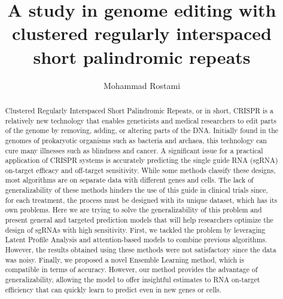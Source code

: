 \documentclass[12pt,a4paper,BCOR=.7cm,headsepline,bibliography=totoc]{report}
\begin{document}
\begin{latin}
\begin{abstract}
Clustered Regularly Interspaced Short Palindromic Repeats, or in short, CRISPR is a relatively new
technology that enables geneticists and medical researchers to edit parts of the genome by removing,
adding, or altering parts of the DNA. Initially found in the genomes of prokaryotic organisms such as
bacteria and archaea, this technology can cure many illnesses such as blindness and cancer. A significant
issue for a practical application of CRISPR systems is accurately predicting the single guide RNA
(sgRNA) on-target efficacy and off-target sensitivity. While some methods classify these designs, most
algorithms are on separate data with different genes and cells. The lack of generalizability of these methods
hinders the use of this guide in clinical trials since, for each treatment, the process must be designed
with its unique dataset, which has its own problems. Here we are trying to solve the generalizability
of this problem and present general and targeted prediction models that will help researchers optimize
the design of sgRNAs with high sensitivity. First, we tackled the problem by leveraging Latent Profile
Analysis and attention-based models to combine previous algorithms. However, the results obtained
using these methods were not satisfactory since the data was noisy. Finally,
we proposed a novel Ensemble Learning method, which is compatible in terms of accuracy. However, our
method provides the advantage of generalizability, allowing the model to offer insightful estimates to
RNA on-target efficiency that can quickly learn to predict even in new genes or cells.
\end{abstract}
\end{latin}

\subject{‌Applied Mathematics}
\author{Mohammad Rostami}
\title{A study in genome editing with clustered regularly interspaced short palindromic repeats}
\date{\latintoday}
\makethesisenglishtitle
\end{document}

